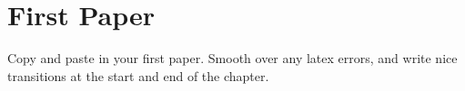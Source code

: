 \chapter{First Paper}\label{ch:3}

Copy and paste in your first paper. Smooth over any latex errors, and write nice transitions at the start and end of the chapter.
